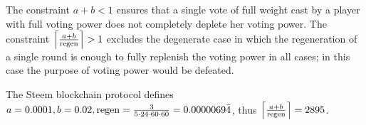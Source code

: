 \begin{remark}
  The constraint $a + b < 1$ ensures that a single vote of full weight cast by a
  player with full voting power does not completely deplete her voting power.
  The constraint $\ceil*{\frac{a + b}{\regen}} > 1$ excludes the degenerate
  case in which the regeneration of a single round is enough to fully replenish
  the voting power in all cases; in this case the purpose of voting power would
  be defeated.
\end{remark}

\begin{remark}
  The Steem blockchain protocol defines $a = 0.0001, b = 0.02, \regen =
  \frac{3}{5 \cdot 24 \cdot 60 \cdot 60} = 0.0000069\bar{4}$, thus
  $\ceil*{\frac{a + b}{\regen}} = 2895$.
\end{remark}
